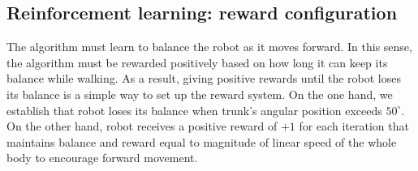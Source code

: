 \subsection{Reinforcement learning: reward configuration}
The algorithm must learn to balance the robot as it moves forward. In this sense, the algorithm must be rewarded positively based on how long it can keep its balance while walking. As a result, giving positive rewards until the robot loses its balance is a simple way to set up the reward system. On the one hand, we establish that robot loses its balance when trunk's angular position exceeds $50^{\circ}$. On the other hand, robot receives a positive reward of $+1$ for each iteration that maintains balance and reward equal to magnitude of linear speed of the whole body to encourage forward movement.
